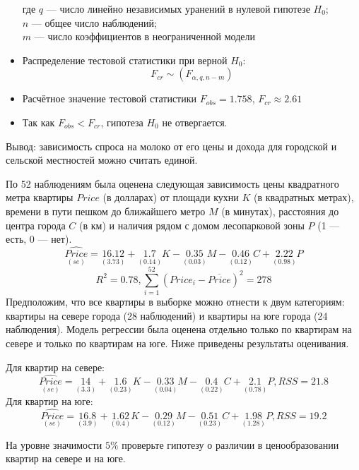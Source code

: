 \begin{problem}
\begin{sol}
\begin{itemize}
\[\]
где $q$ — число линейно независимых уранений в нулевой гипотезе $H_0$;\\
$n$ — общее число наблюдений;\\
$m$ — число коэффициентов в неограниченной модели
\item Распределение тестовой статистики при верной $H_0$:
\[
F_{cr}\sim(F_{\alpha,q,n-m})
\]
\item Расчётное значение тестовой статистики $F_{obs}=1.758$, $F_{cr}\approx 2.61$
\item Так как $F_{obs}<F_{cr}$, гипотеза $H_0$ не отвергается.
\end{itemize}
Вывод: зависимость спроса на молоко от его цены и дохода для городской и сельской местностей можно считать единой.
\end{sol}
\end{problem}



\begin{problem} %
 По 52 наблюдениям была оценена следующая зависимость цены квадратного метра квартиры $Price$ (в долларах) от площади кухни $K$ (в квадратных метрах), времени в пути пешком до ближайшего метро $M$ (в минутах), расстояния до центра города $C$ (в км) и наличия рядом с домом лесопарковой зоны $P$ (1 — есть, 0 — нет).
\[
\underset{(se)}{\widehat{Price}}=\underset{(3.73)}{16.12}+\underset{(0.14)}{1.7}K-\underset{(0.03)}{0.35}M-\underset{(0.12)}{0.46}C+\underset{(0.98)}{2.22}P
\]
\[
R^2=0.78, \sum_{i=1}^{52} {(Price_i-\overline{Price})^2}=278
\]
Предположим, что все квартиры в выборке можно отнести к двум категориям: квартиры на севере города (28 наблюдений) и квартиры на юге города (24 наблюдения). Модель регрессии была оценена отдельно только по квартирам на севере и только по квартирам на юге. Ниже приведены результаты оценивания.

Для квартир на севере:
\[
\underset{(se)}{\widehat{Price}}=\underset{(3.3)}{14}+\underset{(0.23)}{1.6}K-\underset{(0.04)}{0.33}M-\underset{(0.22)}{0.4}C+\underset{(0.78)}{2.1}P, RSS=21.8
\]
Для квартир на юге:
\[
\underset{(se)}{\widehat{Price}}=\underset{(3.9)}{16.8}+\underset{(0.4)}{1.62}K-\underset{(0.12)}{0.29}M-\underset{(0.23)}{0.51}C+\underset{(1.28)}{1.98}P, RSS=19.2
\]

На уровне значимости $5\%$ проверьте гипотезу о различии в ценообразовании квартир на севере и на юге.


\begin{sol}
\end{sol}
\end{problem}



